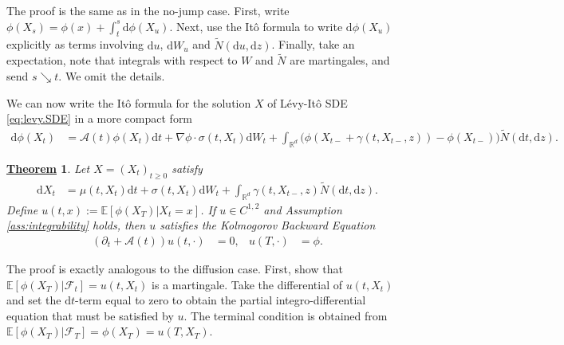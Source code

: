 \documentclass[12pt]{book}
\let\varphi\phi
\numberwithin{equation}{chapter}
\theoremstyle{plain}
\newtheorem{theorem}{\underline{Theorem}}
\numberwithin{theorem}{section}
\theoremstyle{definition}
\numberwithin{exercise}{chapter}
\let\oldendproof\endproof
\renewenvironment{proof}[1][\proofname]{%
  \oldproof[\scshape\underline{#1}]%
}{\oldendproof}
\newcommand{\<}{\langle}
\renewcommand{\>}{\rangle}
\renewcommand{\(}{\left(}
\renewcommand{\)}{\right)}
\renewcommand{\[}{\left[}
\renewcommand{\]}{\right]}
\newcommand\Eb{\mathds{E}}
\newcommand\Rb{\mathds{R}}
\newcommand\Ac{\mathscr{A}}
\newcommand\Fc{\mathscr{F}}
\newcommand\sig{\sigma}
\newcommand\gam{\gamma}
\newcommand\Nt{\widetilde{N}}
\renewcommand\d{\partial}
\newcommand\dd{\mathrm{d}}
\newcommand{\blu}[1]{\textcolor{blue}{#1}}
\begin{document}
\begin{proof}
The proof is the same as in the no-jump case.  First, write $\varphi(X_s) = \varphi(x) + \int_t^s \dd \varphi(X_u)$.  Next, use the It\^o formula to write $\dd \varphi(X_u)$ explicitly as terms involving $\dd u$, $\dd W_u$ and $\Nt(\dd u,\dd z)$.  Finally, take an expectation, note that integrals with respect to $W$ and $\Nt$ are martingales, and send $s \searrow t$.  We omit the details.
\end{proof}


\noindent
We can now write the It\^o formula for the solution $X$ of L\'evy-It\^o SDE \eqref{eq:levy.SDE} in a more compact form
\begin{align}
\dd \varphi(X_t)
	&=	\Ac(t) \varphi(X_t) \dd t + \nabla \varphi \cdot \sig(t,X_t) \dd W_t 
			+ \int_{\Rb^d} \Big( \varphi( X_{t-} + \gam(t,X_{t-},z) ) - \varphi( X_{t-}) \Big) \Nt( \dd t, \dd z ) .
\end{align}

\begin{theorem}
Let $X = (X_t)_{t \geq 0}$ satisfy
\begin{align}
\dd X_t
	&=	\mu(t,X_t) \dd t + \sig(t,X_t) \dd W_t + \int_{\Rb^d} \gam(t,X_{t-},z) \Nt( \dd t, \dd z) .
\end{align}
Define $u(t,x) := \Eb[ \varphi(X_T) | X_t = x ]$.  If $u \in C^{1,2}$ and Assumption \ref{ass:integrability} holds, then $u$ satisfies the \emph{Kolmogorov Backward Equation}
\begin{align}
(\d_t + \Ac(t)) u(t,\cdot)
	&=	0 , &
u(T,\cdot)
	&=	\varphi .
\end{align}
\end{theorem}

\begin{proof}
The proof is exactly analogous to the diffusion case.  First, show that $\Eb[ \varphi(X_T) | \Fc_t] = u(t,X_t)$ is a martingale.  Take the differential of $u(t,X_t)$ and set the $\dd t$-term equal to zero to obtain the partial integro-differential equation that must be satisfied by $u$.  The terminal condition is obtained from $\Eb[\varphi(X_T)|\Fc_T] = \varphi(X_T) = u(T,X_T)$.
\end{proof}
\end{document}
